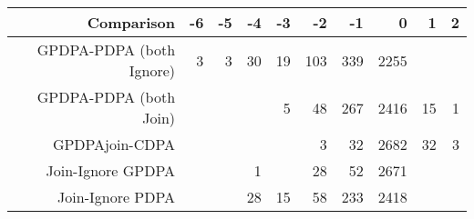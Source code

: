 \begin{tabular}{rrrrrrrrrr}
  \hline
Comparison & -6 & -5 & -4 & -3 & -2 & -1 & 0 & 1 & 2 \\ 
  \hline
GPDPA-PDPA
(both Ignore) & 3 & 3 & 30 & 19 & 103 & 339 & 2255 &  &  \\ 
  GPDPA-PDPA
(both Join) &  &  &  & 5 & 48 & 267 & 2416 & 15 & 1 \\ 
  GPDPAjoin-CDPA
 &  &  &  &  & 3 & 32 & 2682 & 32 & 3 \\ 
  Join-Ignore
GPDPA &  &  & 1 &  & 28 & 52 & 2671 &  &  \\ 
  Join-Ignore
PDPA &  &  & 28 & 15 & 58 & 233 & 2418 &  &  \\ 
   \hline
\end{tabular}

